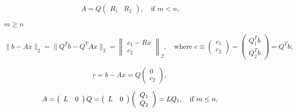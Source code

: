 {\newpage\clearpage
{}%
\begin{displaymath}
A = Q\left( \begin{array}{cc}R_1 & R_2\end{array}\right), \quad
    \mbox{if $m < n$,}
\end{displaymath}%
\lthtmldisplayZ
\lthtmlcheckvsize\clearpage}

{\newpage\clearpage
{}%
$m \geq n$%
\lthtmlinlinemathZ
\lthtmlcheckvsize\clearpage}

{\newpage\clearpage
{}%
\begin{displaymath}
\|b - Ax\|_2 = \| Q^T b - Q^T A x\|_2 =
\left\|\begin{array}{c} c_1 - Rx \\c_2 \end{array}\right \|_2, \quad
\mbox{where } c \equiv
\left( \begin{array}{c} c_1 \\c_2 \end{array} \right) =
\left( \begin{array}{c} Q_1^T b \\Q_2^T b \end{array} \right) =
Q^T b;
\end{displaymath}%
\lthtmldisplayZ
\lthtmlcheckvsize\clearpage}

{\newpage\clearpage
{}%
\begin{displaymath}
r = b - A x = Q \left( \begin{array}{c} 0 \\c_2 \end{array} \right) ,
\end{displaymath}%
\lthtmldisplayZ
\lthtmlcheckvsize\clearpage}

{\newpage\clearpage
{}%
\begin{displaymath}
A = \left( \begin{array}{cc} L & 0 \end{array}\right) Q
  = \left( \begin{array}{cc} L & 0 \end{array}\right)
    \left( \begin{array}{c} Q_1 \\Q_2 \end{array} \right)
  = L Q_1, \quad \mbox{if $ m \le n$,}
\end{displaymath}%
\lthtmldisplayZ
\lthtmlcheckvsize\clearpage}

